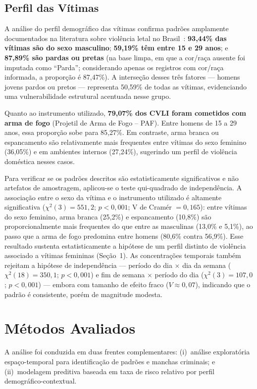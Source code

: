 \documentclass[12pt]{article}
\begin{document}
\subsection{Perfil das Vítimas}
A análise do perfil demográfico das vítimas confirma padrões amplamente
documentados na literatura sobre violência letal no
Brasil~\cite{ipea:2021}: \textbf{93,44\% das vítimas são do sexo masculino};
\textbf{59,19\% têm entre 15 e 29 anos}; e \textbf{87,89\% são pardas ou
pretas} (na base limpa, em que a cor/raça ausente foi imputada como ``Parda'';
considerando apenas os registros com cor/raça informada, a proporção é
87,47\%). A interseção desses três fatores — homens jovens pardos ou pretos —
representa 50,59\% de todas as vítimas, evidenciando uma vulnerabilidade
estrutural acentuada nesse grupo.

Quanto ao instrumento utilizado, \textbf{79,07\% dos CVLI foram cometidos com
arma de fogo} (Projetil de Arma de Fogo -- PAF). Entre homens de 15 a 29
anos, essa proporção sobe para 85,27\%. Em contraste, arma branca ou
espancamento são relativamente mais frequentes entre vítimas do sexo feminino
(36,05\%) e em ambientes internos (27,24\%), sugerindo um perfil de violência
doméstica nesses casos.

Para verificar se os padrões descritos são estatisticamente significativos
e não artefatos de amostragem, aplicou-se o teste qui-quadrado de
independência. A associação entre o sexo da vítima e o instrumento utilizado
é altamente significativa ($\chi^2(3) = 551{,}2$; $p < 0{,}001$; V de
Cramér $= 0{,}165$): entre vítimas do sexo feminino, arma branca (25,2\%) e
espancamento (10,8\%) são proporcionalmente mais frequentes do que entre as
masculinas (13,0\% e 5,1\%), ao passo que a arma de fogo predomina entre
homens (80,6\% contra 56,9\%). Esse resultado sustenta estatisticamente a
hipótese de um perfil distinto de violência associado a vítimas femininas
(Seção~1). As concentrações temporais também rejeitam a hipótese de
independência --- período do dia $\times$ dia da semana ($\chi^2(18) =
350{,}1$; $p < 0{,}001$) e fim de semana $\times$ período do dia ($\chi^2(3)
= 107{,}0$; $p < 0{,}001$) --- embora com tamanho de efeito fraco ($V \approx
0{,}07$), indicando que o padrão é consistente, porém de magnitude modesta.

\section{Métodos Avaliados}
A análise foi conduzida em duas frentes complementares: (i)~análise
exploratória espaço-temporal para identificação de padrões e manchas
criminais; e (ii)~modelagem preditiva baseada em taxa de risco relativo por
perfil demográfico-contextual.
\end{document}
